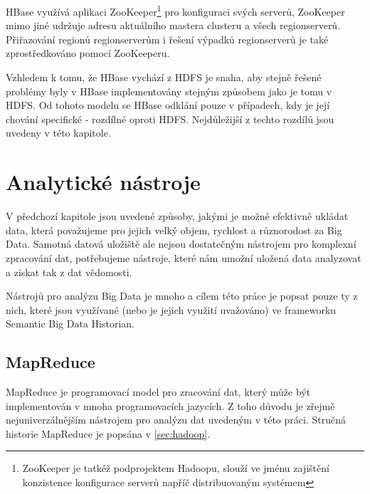 \documentclass[11pt,twoside,a4paper]{book}
\begin{document}
		HBase využívá aplikaci ZooKeeper\footnote{ZooKeeper je tatkéž podprojektem Hadoopu, slouží ve jménu zajištění konzistence konfigurace serverů napříč distribuovaným systémem} pro konfiguraci svých serverů, ZooKeeper mimo jiné udržuje adresu aktuálního mastera clusteru a všech regionserverů. Přiřazování regionů regionserverům i řešení výpadků regionserverů je také zprostředkováno pomocí ZooKeeperu. 
		
		Vzhledem k tomu, že HBase vychází z HDFS je snaha, aby stejně řešené problémy byly v HBase implementovány stejným způsobem jako je tomu v HDFS. Od tohoto modelu se HBase odklání pouze v případech, kdy je její chování specifické - rozdílné oproti HDFS. Nejdůležijší z techto rozdílů jsou uvedeny v této kapitole.


	\section{Analytické nástroje}
		V předchozí kapitole jsou uvedené způsoby, jakými je možné efektivně ukládat data, která považujeme pro jejich velký objem, rychlost a různorodost za Big Data. Samotná datová uložiště ale nejsou dostatečným nástrojem pro komplexní zpracování dat, potřebujeme nástroje, které nám umožní uložená data analyzovat a získat tak z dat vědomosti. 

		Nástrojů pro analýzu Big Data je mnoho a cílem této práce je popsat pouze ty z nich, které jsou využívané (nebo je jejich využití uvažováno) ve frameworku Semantic Big Data Historian. 
	
		\subsection{MapReduce} \label{sec:mapreduce}
			MapReduce je programovací model pro zracování dat, který může být implementován v mnoha programovacích jazycích. Z toho důvodu je zřejmě nejuniverzálnějším nástrojem pro analýzu dat uvedeným v této práci. Stručná historie MapReduce je popsána v \ref{sec:hadoop}. 
\end{document}
